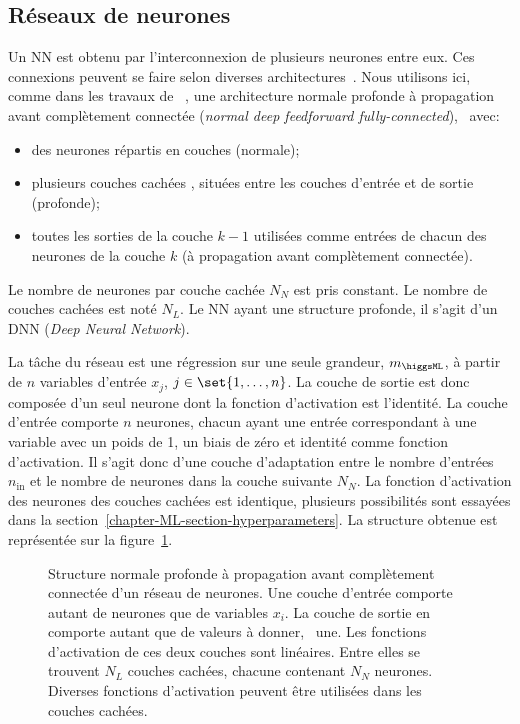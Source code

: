 \subsection{Réseaux de neurones}\label{chapter-ML-section-DNN-networks}
Un NN est obtenu par l'interconnexion de plusieurs neurones entre eux.
Ces connexions peuvent se faire selon diverses architectures~\cite{Sarle1994NeuralNA,DNN}.
Nous utilisons ici,
comme dans les travaux de \citeauthor{BARTSCHI201929}~\cite{BARTSCHI201929},
une architecture
normale profonde à propagation avant complètement connectée (\emph{normal deep feedforward fully-connected}),
\ie\ avec:
\begin{itemize}
\item des neurones répartis en couches (normale);
\item plusieurs couches \og cachées \fg, situées entre les couches d'entrée et de sortie (profonde);
\item toutes les sorties de la couche $k-1$ utilisées comme entrées de chacun des neurones de la couche $k$ (à propagation avant complètement connectée).
\end{itemize}
Le nombre de neurones par couche cachée $N_N$ est pris constant.
Le nombre de couches cachées est noté $N_L$.
Le NN ayant une structure profonde, il s'agit d'un DNN (\emph{Deep Neural Network}).
\par
La tâche du réseau est une régression sur une seule grandeur, $m_{\higgsML}$, à partir de $n$ variables d'entrée $x_j$, $j\in\set{1,\ldots,n}$.
La couche de sortie est donc composée d'un seul neurone dont la fonction d'activation est l'identité.
La couche d'entrée comporte $n$ neurones, chacun ayant une entrée correspondant à une variable avec un poids de 1, un biais de zéro et identité comme fonction d'activation.
Il s'agit donc d'une couche d'adaptation entre le nombre d'entrées $n_\text{in}$ et le nombre de neurones dans la couche suivante $N_N$.
La fonction d'activation des neurones des couches cachées est identique, plusieurs possibilités sont essayées dans la section~\ref{chapter-ML-section-hyperparameters}.
La structure obtenue est représentée sur la figure~\ref{fig-neural_network_fr}.
\begin{figure}[h]
\centering

\caption[Structure d'un réseau de neurones.]{Structure normale profonde à propagation avant complètement connectée d'un réseau de neurones. Une couche d'entrée comporte autant de neurones que de variables $x_i$. La couche de sortie en comporte autant que de valeurs à donner, \ie\ une. Les fonctions d'activation de ces deux couches sont linéaires. Entre elles se trouvent $N_L$ couches cachées, chacune contenant $N_N$ neurones. Diverses fonctions d'activation peuvent être utilisées dans les couches cachées.}
\label{fig-neural_network_fr}
\end{figure}